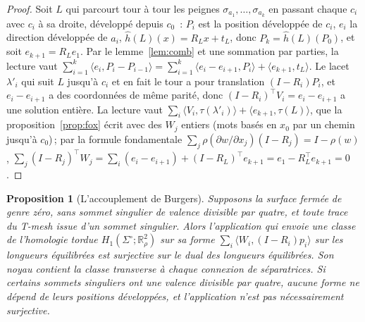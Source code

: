 \documentclass[11pt,a4paper]{article}
\newtheorem{proposition}{Proposition}
\newcommand{\R}{\mathbb{R}}
\newcommand{\lean}[1]{\texttt{\detokenize{#1}}}
\newenvironment{evidence}[3][]{}{}
\begin{document}
\begin{proof}
Soit $L$ qui parcourt tour à tour les peignes $\sigma_{a_1}, \dots,
\sigma_{a_k}$ en passant chaque $c_i$ avec $c_i$ à sa droite, développé depuis
$c_0$~: $P_i$ est la position développée de $c_i$, $e_i$ la direction
développée de $a_i$, $\hat h(L)(x) = R_L x + t_L$, donc $P_k = \hat
h(L)(P_0)$, et soit $e_{k+1} = R_L e_1$. Par le lemme~\ref{lem:comb} et une
sommation par parties, la lecture vaut $\sum_{i=1}^k \langle e_i, P_i -
P_{i-1}\rangle = \sum_{i=1}^k \langle e_i - e_{i+1}, P_i\rangle + \langle
e_{k+1}, t_L\rangle$. Le lacet $\lambda'_i$ qui suit $L$ jusqu'à $c_i$ et en
fait le tour a pour translation $(I - R_i)P_i$, et $e_i - e_{i+1}$ a des
coordonnées de même parité, donc $(I - R_i)^\top V_i = e_i - e_{i+1}$ a une
solution entière. La lecture vaut $\sum_i \langle V_i,
\tau(\lambda'_i)\rangle + \langle e_{k+1}, \tau(L)\rangle$, que la
proposition~\ref{prop:fox} écrit avec des $W_j$ entiers (mots basés en $x_0$
par un chemin jusqu'à $c_0$)\,; par la formule fondamentale $\sum_j
\rho(\partial w/\partial x_j)(I - R_j) = I - \rho(w)$, $\sum_j (I -
R_j)^\top W_j = \sum_i (e_i - e_{i+1}) + (I - R_L)^\top e_{k+1} = e_1 -
R_L^\top e_{k+1} = 0$.
\end{proof}

\begin{evidence}{core}{\lean{Pairing.pairing_surjective}, \lean{Pairing.pairing_surjective_of_ne_one}, \lean{Pairing.form_update_of_eq_one}\,; testé~: les 35 sphères sans valence $4k$ parmi 50 instances aléatoires, rang égal à la dimension sur chacune\,; sur les tores le terme de période le fait échouer (11 sur 15)\,; supposé~: la présentation de $\pi_1(\Sigma^\circ)$ par les $\lambda_i$ et une relation d'holonomie triviale, les positions développées $p_i$ linéaires en les longueurs, chaque peigne développé dans la carte du point de base par des lacets $\lambda_i$\,; non formalisé~: le noyau, et qu'avec une valence divisible par quatre l'application peut ne pas être surjective (seulement qu'aucune forme ne dépend de ces positions)}
\begin{proposition}[L'accouplement de Burgers]\label{prop:pairing}
Supposons la surface fermée de genre zéro, sans sommet singulier de valence
divisible par quatre, et toute trace du T-mesh issue d'un sommet singulier.
Alors l'application qui envoie une classe de l'homologie tordue
$H_1(\Sigma^\circ; \R^2_\rho)$ sur sa forme $\sum_i \langle W_i, (I - R_i)p_i
\rangle$ sur les longueurs équilibrées est surjective sur le dual des
longueurs équilibrées. Son noyau contient la classe transverse à chaque
connexion de séparatrices. Si certains sommets singuliers ont une valence
divisible par quatre, aucune forme ne dépend de leurs positions développées,
et l'application n'est pas nécessairement surjective.
\end{proposition}
\end{evidence}
\end{document}
